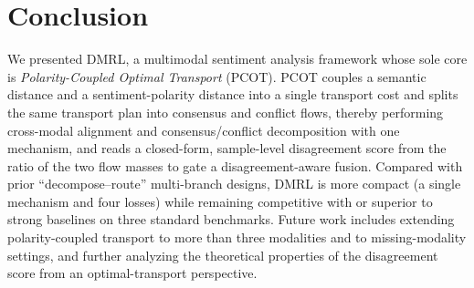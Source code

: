 \documentclass[conference]{IEEEtran}
\begin{document}
\section{Conclusion}
We presented DMRL, a multimodal sentiment analysis framework whose sole core is
\emph{Polarity-Coupled Optimal Transport} (PCOT). PCOT couples a semantic distance
and a sentiment-polarity distance into a single transport cost and splits the same
transport plan into consensus and conflict flows, thereby performing cross-modal
alignment and consensus/conflict decomposition with one mechanism, and reads a
closed-form, sample-level disagreement score from the ratio of the two flow masses
to gate a disagreement-aware fusion. Compared with prior ``decompose--route''
multi-branch designs, DMRL is more compact (a single mechanism and four losses)
while remaining competitive with or superior to strong baselines on three standard
benchmarks. Future work includes extending polarity-coupled transport to more than
three modalities and to missing-modality settings, and further analyzing the
theoretical properties of the disagreement score from an optimal-transport
perspective.
\end{document}
